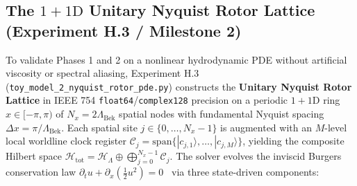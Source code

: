 \documentclass[11pt,a4paper]{article}
\theoremstyle{definition}
\begin{document}
\subsection{The $1+1\text{D}$ Unitary Nyquist Rotor Lattice (Experiment H.3 / Milestone 2)}
\label{subsec:milestone2}
To validate Phases 1 and 2 on a nonlinear hydrodynamic PDE without artificial viscosity or spectral aliasing, Experiment H.3 (\texttt{toy\_\allowbreak{}model\_\allowbreak{}2\_\allowbreak{}nyquist\_\allowbreak{}rotor\_\allowbreak{}pde.py}) constructs the \textbf{Unitary Nyquist Rotor Lattice} in IEEE 754 \texttt{float64}/\texttt{complex128} precision on a periodic $1+1\text{D}$ ring $x \in [-\pi, \pi)$ of $N_x = 2\Lambda_{\text{Bek}}$ spatial nodes with fundamental Nyquist spacing $\Delta x = \pi / \Lambda_{\text{Bek}}$. Each spatial site $j \in \{0, \dots, N_x - 1\}$ is augmented with an $M$-level local worldline clock register $\mathcal{C}_j = \mathrm{span}\{|c_{j,1}\rangle, \dots, |c_{j,M}\rangle\}$, yielding the composite Hilbert space $\mathcal{H}_{\text{tot}} = \mathcal{H}_{\Lambda} \oplus \bigoplus_{j=0}^{N_x - 1} \mathcal{C}_j$.
The solver evolves the inviscid Burgers conservation law $\partial_t u + \partial_x(\frac{1}{2} u^2) = 0$~\cite{lax1973,whitham1974} via three state-driven components:
\end{document}
